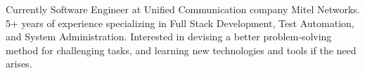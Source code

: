 

\begin{cvparagraph}

Currently Software Engineer at Unified Communication company Mitel Networks. 5+ years of experience specializing in Full Stack Development, Test Automation, and System Administration. Interested in devising a better problem-solving method for challenging tasks, and learning new technologies and tools if the need arises.
\end{cvparagraph}
